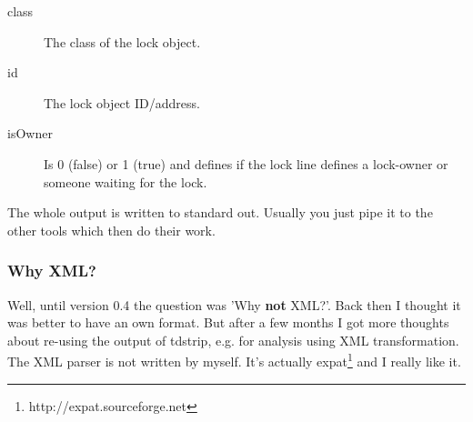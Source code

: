 \begin{description}
\item[class] The class of the lock object.
\item[id] The lock object ID/address.
\item[isOwner] Is 0 (false) or 1 (true) and defines if the lock line defines a lock-owner or someone waiting for the lock.
\end{description}

The whole output is written to standard out.
Usually you just pipe it to the other tools which then do their work.

\subsubsection{Why XML?}
Well, until version 0.4 the question was 'Why \textbf{not} XML?'.
Back then I thought it was better to have an own format.
But after a few months I got more thoughts about re-using the output of tdstrip, e.g. for analysis using XML transformation.
The XML parser is not written by myself.
It's actually expat\footnote{http://expat.sourceforge.net} and I really like it.
